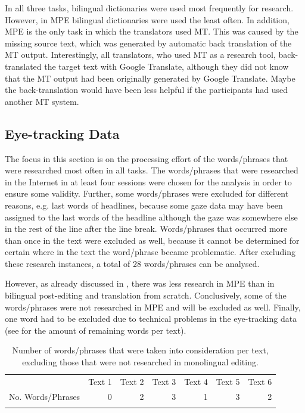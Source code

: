 \documentclass[output=paper]{langsci/langscibook}
\begin{document}
In all three tasks, bilingual dictionaries were used most frequently for research. However, in MPE bilingual dictionaries were used the least often. In addition, MPE is the only task in which the translators used MT. This was caused by the missing source text, which was generated by automatic back translation of the MT output. Interestingly, all translators, who used MT as a research tool, back-translated the target text with Google Translate, although they did not know that the MT output had been originally generated by Google Translate. Maybe the back-translation would have been less helpful if the participants had used another MT system.


\subsection{Eye-tracking Data\label{nitzke:sec:EyeTrackingData}}

The focus in this section is on the processing effort of the words/phrases that were researched most often in all tasks. The words/phrases that were researched in the Internet in at least four sessions were chosen for the analysis in order to ensure some validity. Further, some words/phrases were excluded for different reasons, e.g. last words of headlines, because some gaze data may have been assigned to the last words of the headline although the gaze was somewhere else in the  rest of the line after the line break. Words/phrases that occurred more than once in the text were excluded as well, because it cannot be determined for certain where in the text the word/phrase became problematic. After excluding these research instances, a total of 28 words/phrases can be analysed.


However, as already discussed in , there was less research in MPE than in bilingual post-editing and translation from scratch. Conclusively, some of the words/phrases were not researched in MPE and will be excluded as well. Finally, one word had to be excluded due to technical problems in the eye-tracking data (see  for the amount of remaining words per text). 

\begin{table}
\begin{tabular}{lrrrrrr} & Text 1 & Text 2 & Text 3 & Text 4 & Text 5 & Text 6\\
\lsptoprule
No. Words/Phrases & 0 & 2 & 3 & 1 & 3 & 2\\
\lspbottomrule
\end{tabular}
\caption{Number of words/phrases that were taken into consideration per text, excluding those that were not researched in monolingual editing.}
\label{nitzke:tab:2}
\end{table}
\end{document}
